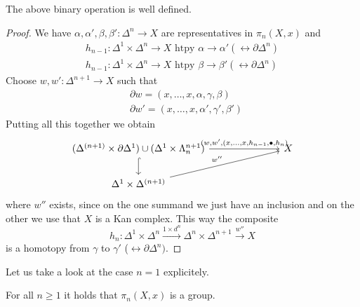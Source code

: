 \begin{prop}
    The above binary operation is well defined.
\end{prop}

\begin{proof}
    We have $\alpha,\alpha',\beta,\beta'\colon \Delta^n \to X$ are representatives in $\pi_n(X,x)$ and
    \begin{align*}
        h_{n-1} \colon \Delta^1\times \Delta^n \to X \text{ htpy } \alpha \to \alpha' (\rel \partial \Delta^n)\\
        h_{n-1} \colon \Delta^1\times \Delta^n \to X \text{ htpy } \beta \to \beta' (\rel \partial \Delta^n)
    \end{align*}
    Choose $w,w' \colon \Delta^{n+1} \to X$ such that 
    \begin{align*}
        &\partial w = (x, \dotsc, x, \alpha, \gamma, \beta)\\
        &\partial w' = (x, \dotsc, x, \alpha', \gamma', \beta')
    \end{align*}
    Putting all this together we obtain 
    \[
    \begin{tikzcd}
        (\Delta^{(n+1)} \times \partial \Delta^1) \cup (\Delta^1 \times \Lambda_n^{n+1})
        \ar[rrr, "{(w,w',(x, \dotsc , x , h_{n-1}, \bullet, h_{n})}"]
        \ar[d, hook]
        &&&
        X
        \\
        \Delta^1 \times \Delta^{(n+1)}
        \ar[rrru, "w''"]
        &&
    \end{tikzcd}
    \]
    where $w''$ exists, since on the one summand we just have an inclusion and on the other we use that $X$ is a Kan complex.
    This way the composite
    \[
    h_n \colon \Delta^1 \times \Delta^n \xrightarrow{1 \times d^n} \Delta^n \times \Delta^{n+1} \xrightarrow{w''} X
    \]
    is a homotopy from $\gamma$ to $\gamma'$ ($\rel \partial \Delta^n)$.
\end{proof}
Let us take a look at the case $n=1$ explicitely.

\begin{prop}
    For all $n \geq 1$ it holds that $ \pi_n(X,x)$ is a group.
\end{prop}

